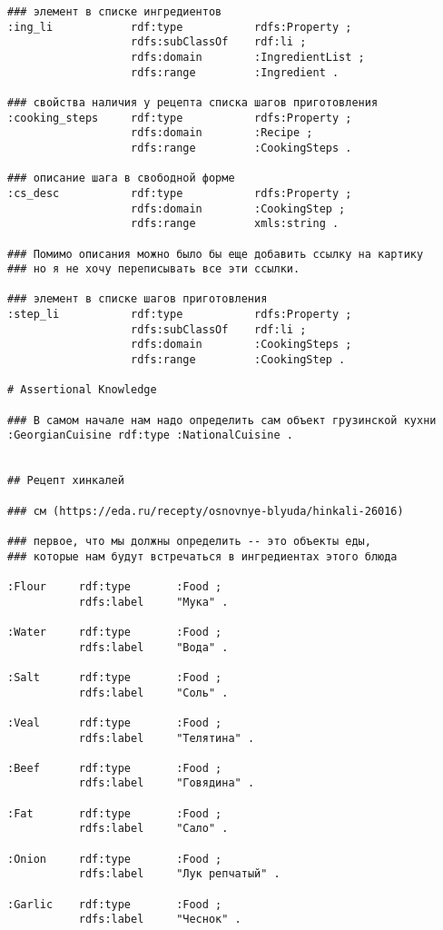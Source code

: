 \documentclass{article}
\begin{document}
\begin{verbatim}
### элемент в списке ингредиентов
:ing_li            rdf:type           rdfs:Property ;
                   rdfs:subClassOf    rdf:li ;
                   rdfs:domain        :IngredientList ;
                   rdfs:range         :Ingredient .

### свойства наличия у рецепта списка шагов приготовления
:cooking_steps     rdf:type           rdfs:Property ;
                   rdfs:domain        :Recipe ;
                   rdfs:range         :CookingSteps .

### описание шага в свободной форме
:cs_desc           rdf:type           rdfs:Property ;
                   rdfs:domain        :CookingStep ;
                   rdfs:range         xmls:string .

### Помимо описания можно было бы еще добавить ссылку на картику
### но я не хочу переписывать все эти ссылки.

### элемент в списке шагов приготовления
:step_li           rdf:type           rdfs:Property ;
                   rdfs:subClassOf    rdf:li ;
                   rdfs:domain        :CookingSteps ;
                   rdfs:range         :CookingStep .

# Assertional Knowledge

### В самом начале нам надо определить сам объект грузинской кухни
:GeorgianCuisine rdf:type :NationalCuisine .


## Рецепт хинкалей

### см (https://eda.ru/recepty/osnovnye-blyuda/hinkali-26016)

### первое, что мы должны определить -- это объекты еды,
### которые нам будут встречаться в ингредиентах этого блюда

:Flour     rdf:type       :Food ;
           rdfs:label     "Мука" .

:Water     rdf:type       :Food ;
           rdfs:label     "Вода" .

:Salt      rdf:type       :Food ;
           rdfs:label     "Соль" .

:Veal      rdf:type       :Food ;
           rdfs:label     "Телятина" .

:Beef      rdf:type       :Food ;
           rdfs:label     "Говядина" .

:Fat       rdf:type       :Food ;
           rdfs:label     "Сало" .

:Onion     rdf:type       :Food ;
           rdfs:label     "Лук репчатый" .

:Garlic    rdf:type       :Food ;
           rdfs:label     "Чеснок" .


\end{verbatim}
\end{document}
